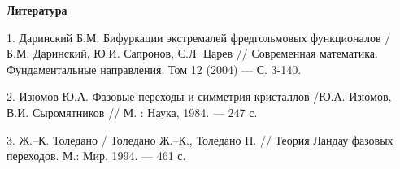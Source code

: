  \begin{center}

{\bf Литература}

\end{center}

1.  Даринский Б.М. Бифуркации экстремалей фредгольмовых функционалов
/ Б.М. Даринский, Ю.И. Сапронов, С.Л. Царев  // Современная
математика. Фундаментальные направления. Том 12 (2004) --- С. 3-140.

2. Изюмов Ю.А. Фазовые переходы и симметрия кристаллов /Ю.А. Изюмов,
В.И. Сыромятников // М. : Наука, 1984. --- 247 с.

3. Ж.--К. Толедано  /  Толедано Ж.--К., Толедано П.  // Теория
Ландау фазовых переходов. М.: Мир. 1994. --- 461 с.
